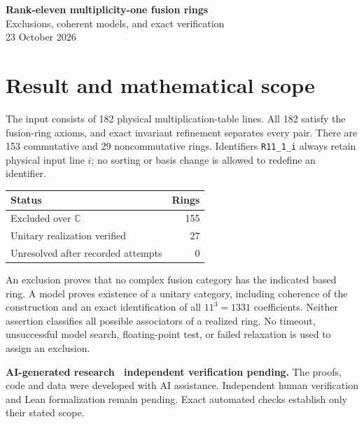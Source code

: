 \documentclass[11pt,a4paper]{article}
\begin{document}
\begin{center}
{\Large\bfseries Rank-eleven multiplicity-one fusion rings}\\[5pt]
{\large Exclusions, coherent models, and exact verification}\\[6pt]
23 October 2026
\end{center}
\section{Result and mathematical scope}
The input consists of 182 physical multiplication-table lines. All 182 satisfy
the fusion-ring axioms, and exact invariant refinement separates every pair.
There are 153 commutative and 29 noncommutative rings. Identifiers
\texttt{R11\_1\_i} always retain physical input line $i$; no sorting or basis
change is allowed to redefine an identifier.

\begin{center}\begin{tabular}{lr}\toprule Status & Rings\\\midrule

Excluded over $\mathbb C$ & 155\\

Unitary realization verified & 27\\

Unresolved after recorded attempts & 0\\

\bottomrule\end{tabular}\end{center}
An exclusion proves that no complex fusion category has the indicated based
ring. A model proves existence of a unitary category, including coherence of
the construction and an exact identification of all $11^3=1331$ coefficients.
Neither assertion classifies all possible associators of a realized ring.
No timeout, unsuccessful model search, floating-point test, or failed
relaxation is used to assign an exclusion.

\medskip
\noindent\textbf{AI-generated research \textperiodcentered\ independent verification pending.}
The proofs, code and data were developed with AI assistance. Independent
human verification and Lean formalization remain pending. Exact automated
checks establish only their stated scope.
\end{document}
